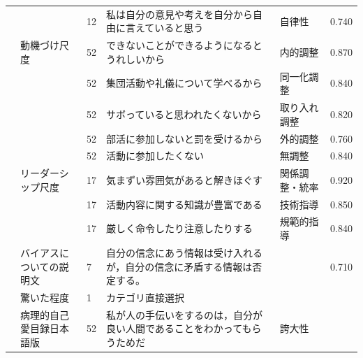 \begin{landscape}
\begin{longtable}{p{2cm}p{2cm}p{2cm}p{6cm}p{2cm}p{2cm}}
		                         &                                  & 12  & 私は自分の意見や考えを自分から自由に言えていると思う                          & 自律性                  & 0.740      \\
		                         & 動機づけ尺度                           & 52  & できないことができるようになるとうれしいから                              & 内的調整                 & 0.870      \\
		                         &                                  & 52  & 集団活動や礼儀について学べるから                                    & 同一化調整                & 0.840      \\
		                         &                                  & 52  & サボっていると思われたくないから                                    & 取り入れ調整               & 0.820      \\
		                         &                                  & 52  & 部活に参加しないと罰を受けるから                                    & 外的調整                 & 0.760      \\
		                         &                                  & 52  & 活動に参加したくない                                          & 無調整                  & 0.840      \\
		                         & リーダーシップ尺度                        & 17  & 気まずい雰囲気があると解きほぐす                                    & 関係調整・統率              & 0.920      \\
		                         &                                  & 17  & 活動内容に関する知識が豊富である                                    & 技術指導                 & 0.850      \\
		                         &                                  & 17  & 厳しく命令したり注意したりする                                     & 規範的指導                & 0.840      \\
		\textcite{Kambara202192}    & バイアスについての説明文                     & 7   & 自分の信念にあう情報は受け入れるが，自分の信念に矛盾する情報は否定する。                &                      & 0.710      \\
		                         & 驚いた程度                            & 1   & カテゴリ直接選択                                            &                      &            \\
		\textcite{Kawasaki202192}   & 病理的自己愛目録日本語版                     & 52  & 私が人の手伝いをするのは，自分が良い人間であることをわかってもらうためだ                & 誇大性                  &            \\

\end{longtable}
\end{landscape}
